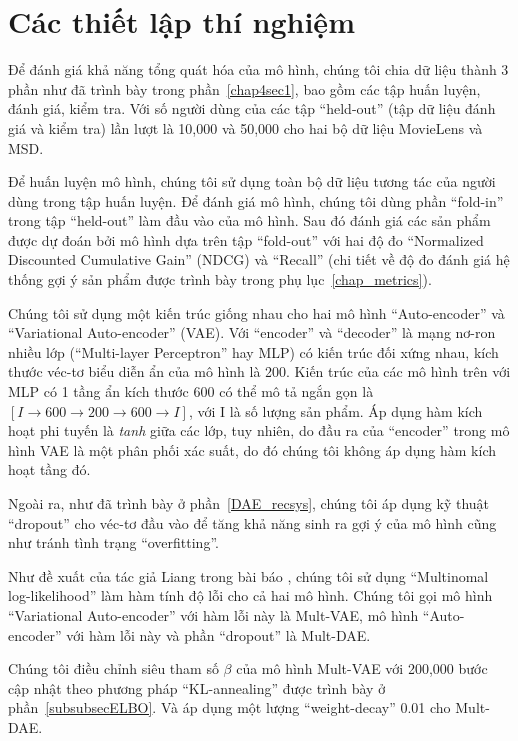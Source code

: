 \section{Các thiết lập thí nghiệm}
\label{setup_experiment}

Để đánh giá khả năng tổng quát hóa của mô hình, chúng tôi chia dữ liệu thành 3 phần như đã trình bày trong phần~\ref{chap4sec1}, bao gồm các tập huấn luyện, đánh giá, kiểm tra. Với số người dùng của các tập ``held-out'' (tập dữ liệu đánh giá và kiểm tra) lần lượt là 10,000 và 50,000 cho hai bộ dữ liệu MovieLens và MSD.

Để huấn luyện mô hình, chúng tôi sử dụng toàn bộ dữ liệu tương tác của người dùng trong tập huấn luyện. Để đánh giá mô hình, chúng tôi dùng phần ``fold-in'' trong tập ``held-out'' làm đầu vào của mô hình. Sau đó đánh giá các sản phẩm được dự đoán bởi mô hình dựa trên tập ``fold-out'' với hai độ đo ``Normalized Discounted Cumulative Gain'' (NDCG) và ``Recall'' (chi tiết về độ đo đánh giá hệ thống gợi ý sản phẩm được trình bày trong phụ lục~\ref{chap_metrics}).

Chúng tôi sử dụng một kiến trúc giống nhau cho hai mô hình ``Auto-encoder'' và ``Variational Auto-encoder'' (VAE). Với ``encoder'' và ``decoder'' là mạng nơ-ron nhiều lớp (``Multi-layer Perceptron'' hay MLP) có kiến trúc đối xứng nhau, kích thước véc-tơ biểu diễn ẩn của mô hình là 200. Kiến trúc của các mô hình trên với MLP có 1 tầng ẩn kích thước 600 có thể mô tả ngắn gọn là $[ I \to 600 \to 200 \to 600 \to I ]$, với I là số lượng sản phẩm. Áp dụng hàm kích hoạt phi tuyến là \textit{tanh} giữa các lớp, tuy nhiên, do đầu ra của ``encoder'' trong mô hình VAE là một phân phối xác suất, do đó chúng tôi không áp dụng hàm kích hoạt tầng đó.

Ngoài ra, như đã trình bày ở phần~\ref{DAE_recsys}, chúng tôi áp dụng kỹ thuật ``dropout'' cho véc-tơ đầu vào để tăng khả năng sinh ra gợi ý của mô hình cũng như tránh tình trạng ``overfitting''.

Như đề xuất của tác giả Liang trong bài báo \cite{mvae}, chúng tôi sử dụng ``Multinomal log-likelihood'' làm hàm tính độ lỗi cho cả hai mô hình. Chúng tôi gọi mô hình ``Variational Auto-encoder'' với hàm lỗi này là Mult-VAE, mô hình ``Auto-encoder'' với hàm lỗi này và phần ``dropout'' là Mult-DAE.

Chúng tôi điều chỉnh siêu tham số $\beta$ của mô hình Mult-VAE với 200,000 bước cập nhật theo phương pháp ``KL-annealing'' được trình bày ở phần~\ref{subsubsecELBO}. Và áp dụng một lượng ``weight-decay'' 0.01 cho Mult-DAE. 

